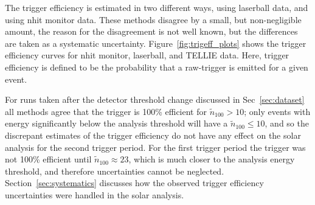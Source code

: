 The trigger efficiency is estimated in two different ways, using laserball
data, and using nhit monitor data.
These methods disagree by a small, but non-negligible amount, the
reason for the disagreement is not well known, but the differences are taken
as a systematic uncertainty.
Figure~\ref{fig:trigeff_plots} shows the trigger efficiency curves
for nhit monitor, laserball, and TELLIE data.
Here, trigger efficiency is defined to be the probability that a raw-trigger
is emitted for a given event.

For runs taken after the detector threshold change discussed in Sec~\ref{sec:dataset}
all methods agree that the trigger is 100\% efficient for $\tilde{n}_{100} > 10$;
only events with energy significantly below the analysis threshold 
will have a $\tilde{n}_{100} \le 10$, and so the discrepant
estimates of the trigger
efficiency do not have any effect on the solar analysis for the second trigger period.
For the first trigger period the trigger was not 100\% efficient until
$\tilde{n}_{100} \approx 23$, which is much closer to the analysis energy
threshold, and therefore uncertainties cannot be neglected.
Section~\ref{sec:systematics} discusses how the observed trigger efficiency
uncertainties were handled in the solar analysis.

